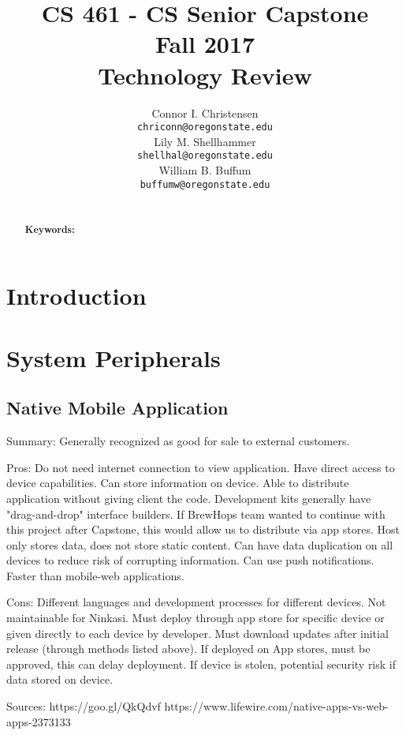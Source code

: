 \documentclass[draftclsnofoot,onecolumn,letterpaper,10pt,compsoc]{IEEEtran}
\title{CS 461 - CS Senior Capstone
	\\Fall 2017
	\\Technology Review
}
\author{
	Connor I. Christensen \\
	\texttt{chriconn@oregonstate.edu}
	\\
	Lily M. Shellhammer \\
	\texttt{shellhal@oregonstate.edu}
	\\
	William B. Buffum \\
	\texttt{buffumw@oregonstate.edu}
}
\begin{document}
\begin{titlingpage}
    \maketitle
    \begin{abstract}
			\\
			\textbf{Keywords:}
    \end{abstract}
		\pagebreak
		\tableofcontents
\end{titlingpage}

\section{Introduction}

\section{System Peripherals}
	\subsection{Native Mobile Application}
    Summary:
        Generally recognized as good for sale to external customers.
    
    Pros:
        Do not need internet connection to view application.
        Have direct access to device capabilities.
        Can store information on device.
        Able to distribute application without giving client the code.
        Development kits generally have "drag-and-drop" interface builders.
        If BrewHops team wanted to continue with this project after             Capstone, this would allow us to distribute via app stores.
        Host only stores data, does not store static content.
        Can have data duplication on all devices to reduce risk of              corrupting information.
        Can use push notifications.
        Faster than mobile-web applications.
        
    Cons:
        Different languages and development processes for different devices.
        Not maintainable for Ninkasi.
        Must deploy through app store for specific device or given directly     to each device by developer.
        Must download updates after initial release (through methods listed     above).
        If deployed on App stores, must be approved, this can delay             deployment.
        If device is stolen, potential security risk if data stored on          device.
    
    Sources:
    https://goo.gl/QkQdvf
    https://www.lifewire.com/native-apps-vs-web-apps-2373133
    
\end{document}
